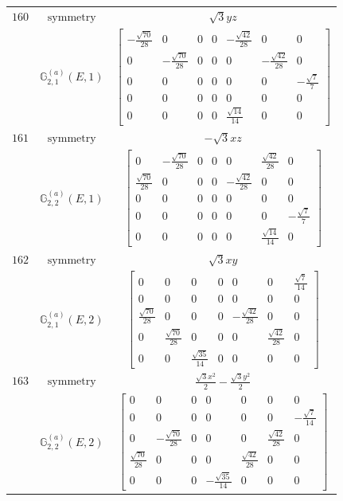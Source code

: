 \documentclass[fleqn,8pt,landscape]{jsarticle}
\begin{document}
\begin{longtable}{ccc}
$ 160 $ & $ \text{symmetry} $ & $ \sqrt{3} y z $ \\
$  $ & $ \mathbb{G}_{2,1}^{(a)}(E,1) $ & $ \begin{bmatrix} - \frac{\sqrt{70}}{28} & 0 & 0 & 0 & - \frac{\sqrt{42}}{28} & 0 & 0 \\ 0 & - \frac{\sqrt{70}}{28} & 0 & 0 & 0 & - \frac{\sqrt{42}}{28} & 0 \\ 0 & 0 & 0 & 0 & 0 & 0 & - \frac{\sqrt{7}}{7} \\ 0 & 0 & 0 & 0 & 0 & 0 & 0 \\ 0 & 0 & 0 & 0 & \frac{\sqrt{14}}{14} & 0 & 0 \end{bmatrix} $ \\ \hline
$ 161 $ & $ \text{symmetry} $ & $ - \sqrt{3} x z $ \\
$  $ & $ \mathbb{G}_{2,2}^{(a)}(E,1) $ & $ \begin{bmatrix} 0 & - \frac{\sqrt{70}}{28} & 0 & 0 & 0 & \frac{\sqrt{42}}{28} & 0 \\ \frac{\sqrt{70}}{28} & 0 & 0 & 0 & - \frac{\sqrt{42}}{28} & 0 & 0 \\ 0 & 0 & 0 & 0 & 0 & 0 & 0 \\ 0 & 0 & 0 & 0 & 0 & 0 & - \frac{\sqrt{7}}{7} \\ 0 & 0 & 0 & 0 & 0 & \frac{\sqrt{14}}{14} & 0 \end{bmatrix} $ \\ \hline
$ 162 $ & $ \text{symmetry} $ & $ \sqrt{3} x y $ \\
$  $ & $ \mathbb{G}_{2,1}^{(a)}(E,2) $ & $ \begin{bmatrix} 0 & 0 & 0 & 0 & 0 & 0 & \frac{\sqrt{7}}{14} \\ 0 & 0 & 0 & 0 & 0 & 0 & 0 \\ \frac{\sqrt{70}}{28} & 0 & 0 & 0 & - \frac{\sqrt{42}}{28} & 0 & 0 \\ 0 & \frac{\sqrt{70}}{28} & 0 & 0 & 0 & \frac{\sqrt{42}}{28} & 0 \\ 0 & 0 & \frac{\sqrt{35}}{14} & 0 & 0 & 0 & 0 \end{bmatrix} $ \\ \hline
$ 163 $ & $ \text{symmetry} $ & $ \frac{\sqrt{3} x^{2}}{2} - \frac{\sqrt{3} y^{2}}{2} $ \\
$  $ & $ \mathbb{G}_{2,2}^{(a)}(E,2) $ & $ \begin{bmatrix} 0 & 0 & 0 & 0 & 0 & 0 & 0 \\ 0 & 0 & 0 & 0 & 0 & 0 & - \frac{\sqrt{7}}{14} \\ 0 & - \frac{\sqrt{70}}{28} & 0 & 0 & 0 & \frac{\sqrt{42}}{28} & 0 \\ \frac{\sqrt{70}}{28} & 0 & 0 & 0 & \frac{\sqrt{42}}{28} & 0 & 0 \\ 0 & 0 & 0 & - \frac{\sqrt{35}}{14} & 0 & 0 & 0 \end{bmatrix} $ \\ \hline

\end{longtable}
\end{document}
